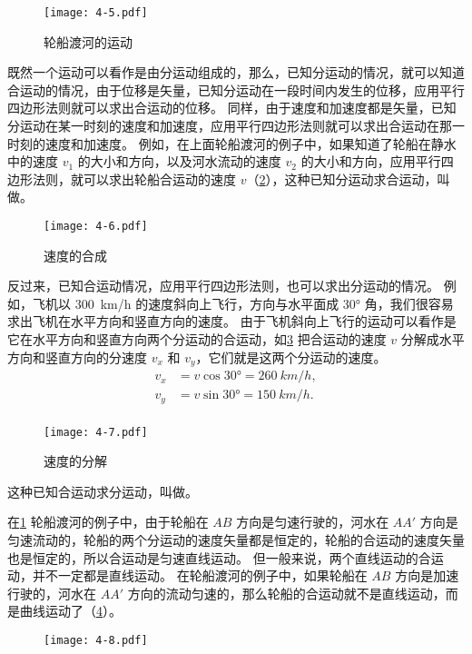 \begin{figure}
  \texttt{[image: 4-5.pdf]}
  \caption{轮船渡河的运动}\label{fig:4-5}
\end{figure}

既然一个运动可以看作是由分运动组成的，那么，已知分运动的情况，就可以知道合运动的情况，由于位移是矢量，已知分运动在一段时间内发生的位移，应用平行四边形法则就可以求出合运动的位移。
同样，由于速度和加速度都是矢量，已知分运动在某一时刻的速度和加速度，应用平行四边形法则就可以求出合运动在那一时刻的速度和加速度。
例如，在上面轮船渡河的例子中，如果知道了轮船在静水中的速度 $v_1$ 的大小和方向，以及河水流动的速度 $v_2$ 的大小和方向，应用平行四边形法则，就可以求出轮船合运动的速度 $v$（\cref{fig:4-6}），这种已知分运动求合运动，叫做。

\begin{figure}
  \texttt{[image: 4-6.pdf]}
  \caption{速度的合成}\label{fig:4-6}
\end{figure}

反过来，已知合运动情况，应用平行四边形法则，也可以求出分运动的情况。
例如，飞机以 \qty{300}{km/h} 的速度斜向上飞行，方向与水平面成 \ang{30} 角，我们很容易求出飞机在水平方向和竖直方向的速度。
由于飞机斜向上飞行的运动可以看作是它在水平方向和竖直方向两个分运动的合运动，如\cref{fig:4-7} 把合运动的速度 $v$ 分解成水平方向和竖直方向的分速度 $v_x$ 和 $v_y$，它们就是这两个分运动的速度。
\[\begin{split}
v_x&=v\cos\ang{30}=\qty{260}{km/h},\\
v_y&=v\sin\ang{30}=\qty{150}{km/h}.\\
\end{split} \]

\begin{figure}
  \texttt{[image: 4-7.pdf]}
  \caption{速度的分解}\label{fig:4-7}
\end{figure}

这种已知合运动求分运动，叫做。

在\cref{fig:4-5} 轮船渡河的例子中，由于轮船在 $AB$ 方向是匀速行驶的，河水在 $AA'$ 方向是匀速流动的，轮船的两个分运动的速度矢量都是恒定的，轮船的合运动的速度矢量也是恒定的，所以合运动是匀速直线运动。
但一般来说，两个直线运动的合运动，并不一定都是直线运动。
在轮船渡河的例子中，如果轮船在 $AB$ 方向是加速行驶的，河水在 $AA'$ 方向的流动匀速的，那么轮船的合运动就不是直线运动，而是曲线运动了（\cref{fig:4-8}）。

\begin{figure}
  \texttt{[image: 4-8.pdf]}
  \caption{}\label{fig:4-8}
\end{figure}

